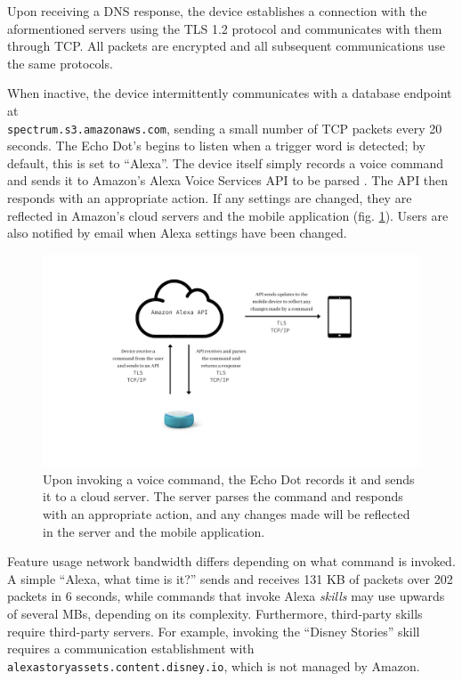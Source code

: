 \documentclass[12pt]{ucthesis}
\begin{document}
Upon receiving a DNS response, the device establishes a connection with the aformentioned servers using the TLS 1.2 protocol and communicates with them through TCP. All packets are encrypted and all subsequent communications use the same protocols.

When inactive, the device intermittently communicates with a database endpoint at \\\texttt{spectrum.s3.amazonaws.com}, sending a small number of TCP packets every 20 seconds. The Echo Dot's begins to listen when a trigger word is detected; by default, this is set to ``Alexa''. The device itself simply records a voice command and sends it to Amazon's Alexa Voice Services API to be parsed \cite{alexa}. The API then responds with an appropriate action. If any settings are changed, they are reflected in Amazon's cloud servers and the mobile application (fig. \ref{fig:voicecom}). Users are also notified by email when Alexa settings have been changed.

\begin{figure}
    \includegraphics[width=\textwidth]{voice command.jpg}
    \caption{Upon invoking a voice command, the Echo Dot records it and sends it to a cloud server. The server parses the command and responds with an appropriate action, and any changes made will be reflected in the server and the mobile application.}
    \label{fig:voicecom}
\end{figure}

Feature usage network bandwidth differs depending on what command is invoked. A simple ``Alexa, what time is it?'' sends and receives 131 KB of packets over 202 packets in 6 seconds, while commands that invoke Alexa \textit{skills} may use upwards of several MBs, depending on its complexity. Furthermore, third-party skills require third-party servers. For example, invoking the ``Disney Stories'' skill requires a communication establishment with \texttt{alexastoryassets.content.disney.io}, which is not managed by Amazon.
\end{document}
